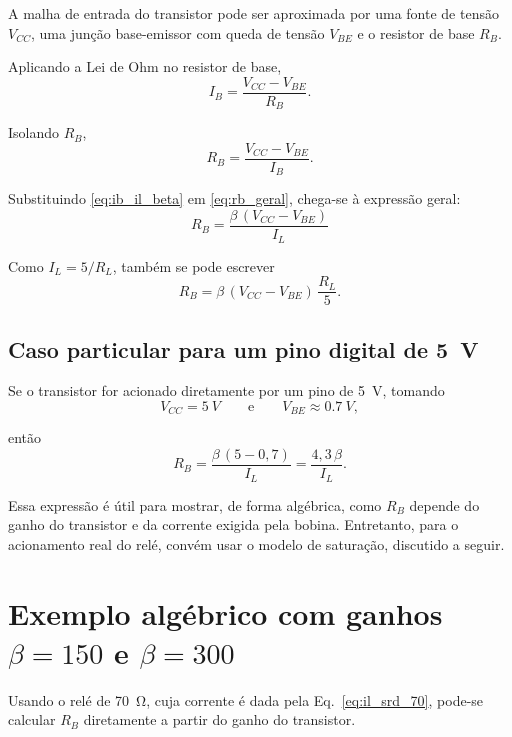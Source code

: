 \documentclass[12pt,a4paper]{article}
\newcommand{\Vcc}{V_{CC}}
\newcommand{\Vbe}{V_{BE}}
\newcommand{\Ib}{I_B}
\newcommand{\Il}{I_L}
\newcommand{\Rb}{R_B}
\newcommand{\Rl}{R_L}
\begin{document}
A malha de entrada do transistor pode ser aproximada por uma fonte de tensão $\Vcc$, uma junção base-emissor com queda de tensão $\Vbe$ e o resistor de base $\Rb$.

Aplicando a Lei de Ohm no resistor de base,
\begin{equation}
\Ib = \frac{\Vcc - \Vbe}{\Rb}.
\label{eq:ib_ohm}
\end{equation}

Isolando $\Rb$,
\begin{equation}
\Rb = \frac{\Vcc - \Vbe}{\Ib}.
\label{eq:rb_geral}
\end{equation}

Substituindo \eqref{eq:ib_il_beta} em \eqref{eq:rb_geral}, chega-se à expressão geral:
\begin{equation}
\boxed{\Rb = \frac{\beta\,(\Vcc - \Vbe)}{\Il}}
\label{eq:rb_beta_il}
\end{equation}

Como $\Il = 5/\Rl$, também se pode escrever
\begin{equation}
\boxed{\Rb = \beta\,(\Vcc - \Vbe)\,\frac{\Rl}{5}}.
\label{eq:rb_beta_rl}
\end{equation}

\subsection*{Caso particular para um pino digital de \SI{5}{V}}

Se o transistor for acionado diretamente por um pino de \SI{5}{V}, tomando
\begin{equation}
\Vcc = \SI{5}{V}
\qquad \text{e} \qquad
\Vbe \approx \SI{0,7}{V},
\end{equation}

então
\begin{equation}
\Rb = \frac{\beta\,(5 - 0,7)}{\Il}
= \frac{4,3\,\beta}{\Il}.
\label{eq:rb_43}
\end{equation}

Essa expressão é útil para mostrar, de forma algébrica, como $\Rb$ depende do ganho do transistor e da corrente exigida pela bobina. Entretanto, para o acionamento real do relé, convém usar o modelo de saturação, discutido a seguir.

\section{Exemplo algébrico com ganhos $\beta = 150$ e $\beta = 300$}

Usando o relé de \SI{70}{\ohm}, cuja corrente é dada pela Eq.~\eqref{eq:il_srd_70}, pode-se calcular $\Rb$ diretamente a partir do ganho do transistor.
\end{document}
